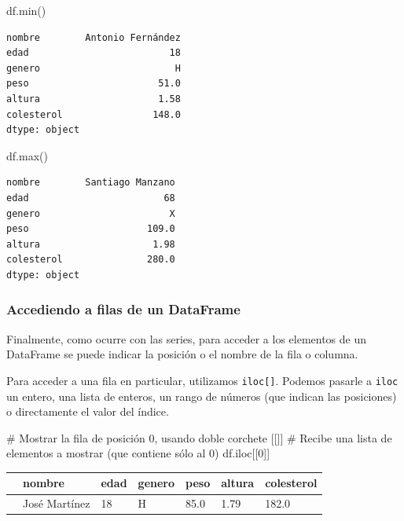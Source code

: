 \documentclass[
  letterpaper,
  DIV=11,
  numbers=noendperiod]{scrreprt}
\newenvironment{Shaded}{\begin{snugshade}}{\end{snugshade}}
\newcommand{\BuiltInTok}[1]{\textcolor[rgb]{0.00,0.23,0.31}{#1}}
\newcommand{\CommentTok}[1]{\textcolor[rgb]{0.37,0.37,0.37}{#1}}
\newcommand{\DecValTok}[1]{\textcolor[rgb]{0.68,0.00,0.00}{#1}}
\newcommand{\NormalTok}[1]{\textcolor[rgb]{0.00,0.23,0.31}{#1}}
\begin{document}
\begin{Shaded}
\begin{Highlighting}[]
\NormalTok{df.}\BuiltInTok{min}\NormalTok{()}
\end{Highlighting}
\end{Shaded}

\begin{verbatim}
nombre        Antonio Fernández
edad                         18
genero                        H
peso                       51.0
altura                     1.58
colesterol                148.0
dtype: object
\end{verbatim}

\begin{Shaded}
\begin{Highlighting}[]
\NormalTok{df.}\BuiltInTok{max}\NormalTok{()}
\end{Highlighting}
\end{Shaded}

\begin{verbatim}
nombre        Santiago Manzano
edad                        68
genero                       X
peso                     109.0
altura                    1.98
colesterol               280.0
dtype: object
\end{verbatim}

\subsubsection{Accediendo a filas de un
DataFrame}\label{accediendo-a-filas-de-un-dataframe}

Finalmente, como ocurre con las series, para acceder a los elementos de
un DataFrame se puede indicar la posición o el nombre de la fila o
columna.

Para acceder a una fila en particular, utilizamos \texttt{iloc{[}{]}}.
Podemos pasarle a \texttt{iloc} un entero, una lista de enteros, un
rango de números (que indican las posiciones) o directamente el valor
del índice.

\begin{Shaded}
\begin{Highlighting}[]
\CommentTok{\# Mostrar la fila de posición 0, usando doble corchete [[]]}
\CommentTok{\# Recibe una lista de elementos a mostrar (que contiene sólo al 0)}
\NormalTok{df.iloc[[}\DecValTok{0}\NormalTok{]]}
\end{Highlighting}
\end{Shaded}

\begin{longtable}[]{@{}lllllll@{}}
\toprule\noalign{}
& nombre & edad & genero & peso & altura & colesterol \\
\midrule\noalign{}
\endhead
\bottomrule\noalign{}
\endlastfoot
0 & José Martínez & 18 & H & 85.0 & 1.79 & 182.0 \\
\end{longtable}
\end{document}
